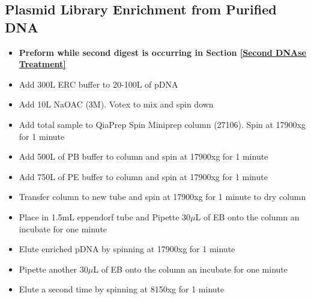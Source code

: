 \documentclass[a4paper]{article}
\begin{document}
    \subsection{Plasmid Library Enrichment from Purified DNA}
		\begin{itemize}
    		
            \item \textbf{Preform while second digest is occurring in Section \ref{Second DNAse Treatment}}
            
    		\item Add 300\textmu L ERC buffer to 20-100\textmu L of pDNA
        	
        	\item Add 10\textmu L NaOAC (3M). Votex to mix and spin down
        
        	\item Add total sample to QiaPrep Spin Miniprep column (27106). Spin at 17900xg for 1 minute
        
        	\item Add 500\textmu L of PB buffer to column and spin at 17900xg for 1 minute
        
        	\item Add 750\textmu L of PE buffer to column and spin at 17900xg for 1 minute
        
        	\item Transfer column to new tube and spin at 17900xg for 1 minute to dry column
        	
            \item Place in 1.5mL eppendorf tube and Pipette 30$\mu$L of EB onto the column an incubate for one minute 
            
            \item Elute enriched pDNA by spinning at 17900xg  for 1 minute
            
            \item Pipette another 30$\mu$L of EB onto the column an incubate for one minute
            
            \item Elute a second time by spinning at 8150xg for 1 minute
    
    \end{itemize}
    
\end{document}
